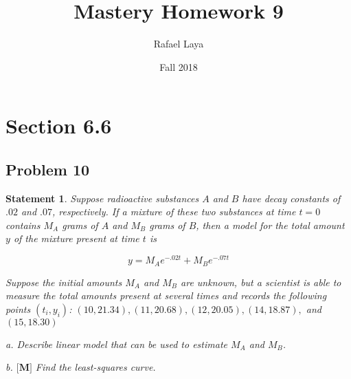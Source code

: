 \documentclass[12pt, letterpaper]{article}
\title{Mastery Homework 9}
\author{Rafael Laya}
\date{Fall 2018}
\theoremstyle{statement}
\theoremstyle{statement}
\newtheorem*{atmStat}{Statement}
\begin{document}
    \maketitle

    \section*{Section 6.6}
    \subsection*{Problem 10}
    \begin{atmStat}
    Suppose radioactive substances $A$ and $B$ have decay constants of $.02$ and $.07$, respectively. If a mixture of these two substances at time $t = 0$ contains $M_A$ grams of $A$ and $M_B$ grams of $B$, then a model for the total amount $y$ of the mixture present at time $t$ is 
    
    $$
    y = M_Ae^{-.02t}+M_Be^{-.07t}
    $$
    
    Suppose the initial amounts $M_A$ and $M_B$ are unknown, but a scientist is able to measure the total amounts present at several times and records the following points $(t_i, y_i)$: $(10, 21.34), (11,20.68), (12, 20.05), (14, 18.87),$ and $(15, 18.30)$
    
    a. Describe linear model that can be used to estimate $M_A$ and $M_B$.
    
    b. $\textbf{[M]}$ Find the least-squares curve.
    
    
    \end{atmStat}
\end{document}
